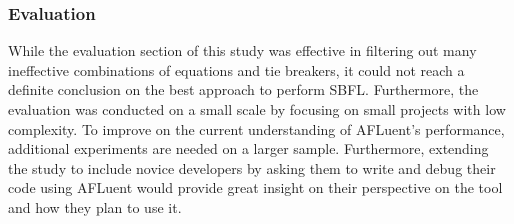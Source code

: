 \subsubsection{Evaluation}

While the evaluation section of this study was effective in filtering out many
ineffective combinations of equations and tie breakers, it could not reach a
definite conclusion on the best approach to perform SBFL. Furthermore, the
evaluation was conducted on a small scale by focusing on small projects with low
complexity. To improve on the current understanding of AFLuent's performance,
additional experiments are needed on a larger sample. Furthermore, extending the
study to include novice developers by asking them to write and debug their code
using AFLuent would provide great insight on their perspective on the tool
and how they plan to use it.
